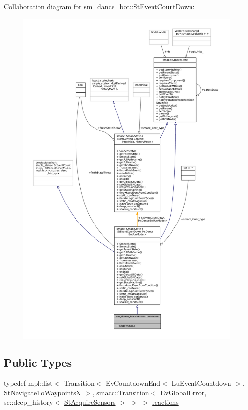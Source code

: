 Collaboration diagram for sm\+\_\+dance\+\_\+bot\+:\+:St\+Event\+Count\+Down\+:
\nopagebreak
\begin{figure}[H]
\begin{center}
\leavevmode
\includegraphics[width=350pt]{structsm__dance__bot_1_1StEventCountDown__coll__graph}
\end{center}
\end{figure}
\subsection*{Public Types}
\begin{DoxyCompactItemize}
\item 
typedef mpl\+::list$<$ Transition$<$ Ev\+Countdown\+End$<$ Lu\+Event\+Countdown $>$, \hyperlink{structsm__dance__bot_1_1StNavigateToWaypointsX}{St\+Navigate\+To\+WaypointsX} $>$, \hyperlink{classsmacc_1_1Transition}{smacc\+::\+Transition}$<$ \hyperlink{structsm__dance__bot_1_1EvGlobalError}{Ev\+Global\+Error}, sc\+::deep\+\_\+history$<$ \hyperlink{structsm__dance__bot_1_1StAcquireSensors}{St\+Acquire\+Sensors} $>$ $>$ $>$ \hyperlink{structsm__dance__bot_1_1StEventCountDown_a8197124719da64c2cb881fd063c1bac2}{reactions}
\end{DoxyCompactItemize}
